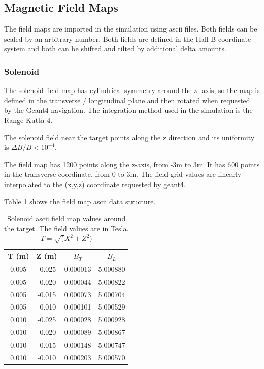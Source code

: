 \subsection{Magnetic Field Maps} \label{clas12FieldMaps}


The field maps are imported in the simulation using ascii files. Both fields can be scaled by an arbitrary number.
Both fields are defined in the Hall-B coordinate system and both can be shifted and tilted by additional delta amounts.

\subsubsection{Solenoid}
The solenoid field map has cylindrical symmetry around the z- axis, so the map is defined in the transverse / longitudinal plane
and then rotated when requested by the Geant4 navigation. The integration method used in the simulation is the Range-Kutta 4.

The solenoid field near the target points along the z direction and its uniformity is $\Delta B / B < 10^{-4}$.

The field map has 1200 points along the z-axis, from -3m to 3m. It has 600 points in the transverse coordinate, from 0 to 3m.
The field grid values are linearly interpolated to the (x,y,z) coordinate requested by geant4.

Table \ref{tab:solMap} shows the field map ascii data structure.


\begin{table}[h]
	\begin{center}
		\begin{tabular}{| c | c | c | c |}
			T (m)  & Z (m) &  $B_T $  & $ B_L $ \\
			\hline
          0.005  &  -0.025 & 0.000013  & 5.000880 \\
          0.005  &  -0.020 & 0.000044  & 5.000822 \\
          0.005  &  -0.015 & 0.000073  & 5.000704 \\
          0.005  &  -0.010 & 0.000101  & 5.000529 \\
          0.010  &  -0.025 & 0.000028  & 5.000928 \\
          0.010  &  -0.020 & 0.000089  & 5.000867 \\
          0.010  &  -0.015 & 0.000148  & 5.000747 \\
          0.010  &  -0.010 & 0.000203  & 5.000570 \\
		\end{tabular}
	\end{center}
	\caption{Solenoid ascii field map values around the target. The field values are in Tesla. $T=\sqrt(X^2+Z^2)$}\label{tab:solMap}
\end{table}

